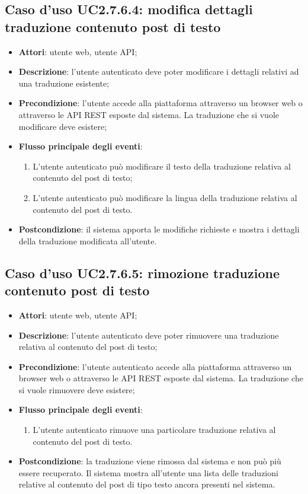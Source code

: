 \subsection{Caso d'uso UC2.7.6.4: modifica dettagli traduzione contenuto post di testo}
\begin{itemize}
\item \textbf{Attori}: utente web, utente API;
\item \textbf{Descrizione}: l'utente autenticato deve poter modificare i dettagli relativi ad una traduzione esistente; 
      \item \textbf{Precondizione}: l'utente accede alla piattaforma attraverso un browser web o attraverso le API REST esposte dal sistema. La traduzione che si vuole modificare deve esistere;

        \item \textbf{Flusso principale degli eventi}:
          \begin{enumerate}
          \item L'utente autenticato può modificare il testo della traduzione relativa al contenuto del post di testo;
          \item L'utente autenticato può modificare la lingua della traduzione relativa al contenuto del post di testo.

      \end{enumerate}
    \item \textbf{Postcondizione}: il sistema apporta le modifiche richieste e mostra i dettagli della traduzione modificata all'utente.
  \end{itemize}
\hypertarget{UC2.7.6.5}{}
\subsection{Caso d'uso UC2.7.6.5: rimozione traduzione contenuto post di testo}
\begin{itemize}
\item \textbf{Attori}: utente web, utente API;
\item \textbf{Descrizione}: l'utente autenticato deve poter rimuovere una traduzione relativa al contenuto del post di testo; 
      \item \textbf{Precondizione}: l'utente autenticato accede alla piattaforma attraverso un browser web o attraverso le API REST esposte dal sistema. La traduzione che si vuole rimuovere deve esistere;

        \item \textbf{Flusso principale degli eventi}:
          \begin{enumerate}
          \item L'utente autenticato rimuove una particolare traduzione relativa al contenuto del post di testo.

      \end{enumerate}
    \item \textbf{Postcondizione}: la traduzione viene rimossa dal sistema e non può più essere recuperato. Il sistema mostra all'utente una lista delle traduzioni relative al contenuto del post di tipo testo ancora presenti nel sistema.
  \end{itemize}
\hypertarget{UC2.8}{}

